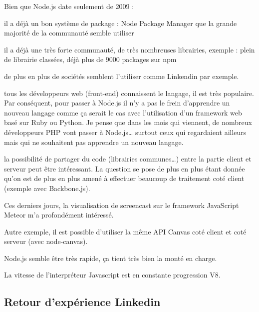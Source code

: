 \begin{list}{•}{}
  \item
  Bien que Node.js date seulement de 2009 :
    \begin{list}{•}{}
      \item
      il a déjà un bon système de package : Node Package Manager que la grande majorité de la communauté semble utiliser
      \item
          il a déjà une très forte communauté, de très nombreuses librairies, exemple : plein de librairie classées, déjà plus de 9000 packages sur npm
      \item
      de plus en plus de sociétés semblent l'utiliser comme Linkendin par exemple.
    \end{list}
    
    
  \item 
  tous les développeurs web (front-end) connaissent le langage, il est très populaire. Par conséquent, pour passer à Node.js il n'y a pas le frein d'apprendre un nouveau langage comme ça serait le cas avec l'utilisation d'un framework web basé sur Ruby ou Python. Je pense que dans les mois qui viennent, de nombreux développeurs PHP vont passer à Node.js… surtout ceux qui regardaient ailleurs mais qui ne souhaitent pas apprendre un nouveau langage.

  \item
      la possibilité de partager du code (librairies communes…) entre la partie client et serveur peut être intéressant. La question se pose de plus en plus étant donnée qu'on est de plus en plus amené à effectuer beaucoup de traitement coté client (exemple avec Backbone.js).
      
  \item
  Ces derniers jours, la visualisation de screencast sur le framework JavaScript Meteor m'a profondément intéressé.
  
  \item
  Autre exemple, il est possible d'utiliser la même API Canvas coté client et coté serveur (avec node-canvas).
  
  \item
  Node.js semble être très rapide, ça tient très bien la monté en charge.
  
  \item
  La vitesse de l'interpréteur Javascript est en constante progression V8.

\end{list}

\subsection{Retour d'expérience Linkedin}